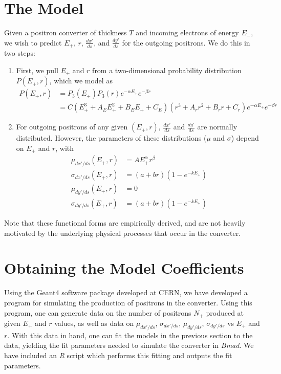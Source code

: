\documentclass[12pt]{article}
\begin{document}
\newpage

\section*{The Model}

Given a positron converter of thickness $T$ and incoming electrons of energy $E_-$, we wish to predict $E_+$, $r$, $\frac{dx'}{ds}$, and $\frac{dy'}{ds}$ for the outgoing positrons.
We do this in two steps:
\begin{enumerate}
\item
First, we pull $E_+$ and $r$ from a two-dimensional probability distribution $P(E_+, r)$, which we model as
\begin{align*}
P(E_+, r) & = P_3(E_+) P_3(r) e^{-\alpha E_+} e^{-\beta r} \\
& = C(E_+^3 + A_E E_+^2 + B_E E_+ + C_E) (r^3 + A_r r^2 + B_r r + C_r) e^{-\alpha E_+} e^{-\beta r}
\end{align*}

\item
For outgoing positrons of any given $(E_+, r)$, $\frac{dx'}{ds}$ and $\frac{dy'}{ds}$ are normally distributed.
However, the parameters of these distributions ($\mu$ and $\sigma$) depend on $E_+$ and $r$, with
\begin{align*}
\mu_{dx'/ds}(E_+, r) & = A E_+^\alpha r^\beta \\
\sigma_{dx'/ds} (E_+, r) & = (a+br) (1 - e^{-k E_+}) \\
\mu_{dy'/ds} (E_+, r) & = 0 \\
\sigma_{dy'/ds} (E_+, r) & = (a+br) (1 - e^{-k E_+})
\end{align*}

\end{enumerate}

Note that these functional forms are empirically derived, and are not heavily motivated by the underlying physical processes that occur in the converter.


\section*{Obtaining the Model Coefficients}

Using the Geant4\cite{geant} software package developed at CERN, we have developed a program for simulating the production of positrons in the converter.
Using this program, one can generate data on the number of positrons $N_+$ produced at given $E_+$ and $r$ values, as well as data on $\mu_{dx'/ds}$, $\sigma_{dx'/ds}$, $\mu_{dy'/ds}$, $\sigma_{dy'/ds}$ vs $E_+$ and $r$.
With this data in hand, one can fit the models in the previous section to the data, yielding the fit parameters needed to simulate the converter in \textit{Bmad}.
We have included an \textit{R} script which performs this fitting and outputs the fit parameters.
\end{document}
